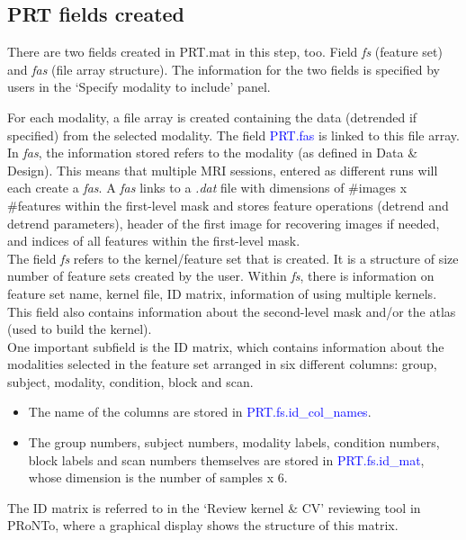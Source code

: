 \subsection{PRT fields created}

There are two fields created in PRT.mat in this step, too. Field \textit{fs} (feature set) and \textit{fas} (file array structure). The information for the two fields is specified by users in the `Specify modality to include' panel.

For each modality, a file array is created containing the data (detrended if specified) from the selected modality. The field \textcolor{blue}{PRT.fas} is linked to this file array. In \textit{fas}, the information stored refers to the modality (as defined in Data \& Design). This means that multiple MRI sessions, entered as different runs will each create a \textit{fas}. A \textit{fas} links to a \textit{.dat} file with dimensions of \#images x \#features within the first-level mask and stores feature operations (detrend and detrend parameters), header of the first image for recovering images if needed, and indices of all features within the first-level mask.
\\

The field \textit{fs} refers to the kernel/feature set that is created. It is a structure of size number of feature sets created by the user. Within \textit{fs}, there is information on feature set name, kernel file, ID matrix, information of using multiple kernels. This field also contains information about the second-level mask and/or the atlas (used to build the kernel).
\\

One important subfield is the ID matrix, which contains information about the modalities selected in the feature set arranged in six different columns: group, subject, modality, condition, block and scan.

\begin{itemize}
\item The name of the columns are stored in \textcolor{blue}{PRT.fs.id\_col\_names}.
\item The group numbers, subject numbers, modality labels, condition numbers, block labels and scan numbers themselves are stored in \textcolor{blue}{PRT.fs.id\_mat}, whose dimension is the number of samples x 6.
\end{itemize}

The ID matrix is referred to in the `Review kernel \& CV' reviewing tool in PRoNTo, where a graphical display shows the structure of this matrix.

